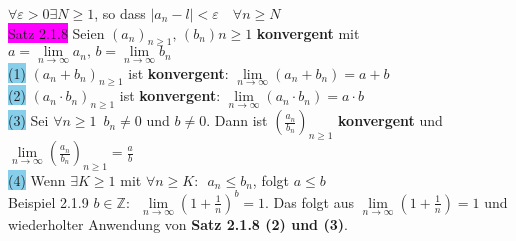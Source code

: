 \documentclass[landscape, 10pt]{article}
\newcommand{\Z}{\mathbb{Z}}
\begin{document}
\begin{multicols}{3}
{                            $\forall\varepsilon >0\exists N\geqslant 1$}, 
                            so dass \textcolor{
                            NavyBlue}{
                            $|a_n-l|<\varepsilon \quad\forall n\geqslant N$}\\
              \colorbox{magenta}{Satz 2.1.8} 
                     Seien \textcolor{NavyBlue}{
                     $(a_n)_{n\geqslant 1},\,(b_n){n\geqslant 1}$} 
                     \textbf{konvergent} mit 
                     \textcolor{NavyBlue}{$a=\lim\limits_{n\to\infty}a_n,\,
                     b=\lim\limits_{n\to\infty}b_n$}\\
                     \colorbox{SkyBlue}{(1)} 
                            \textcolor{NavyBlue}{$(a_n+b_n)_{n\geqslant 1}$} 
                            ist \textbf{konvergent}: 
                            \textcolor{NavyBlue}{
                            $\lim\limits_{n\to\infty}(a_n+b_n)=a+b$}\\
                     \colorbox{SkyBlue}{(2)} 
                            \textcolor{NavyBlue}{$(a_n\cdot b_n)_{n\geqslant 1}$} 
                            ist \textbf{konvergent}: 
                            \textcolor{NavyBlue}{
                            $\lim\limits_{n\to\infty}(a_n\cdot b_n)=a\cdot b$}\\
                     \colorbox{SkyBlue}{(3)} Sei 
                            \textcolor{NavyBlue}{$\forall n\geqslant 1\enspace b_n\neq 0$} 
                            und \textcolor{NavyBlue}{$b\neq 0$}. 
                            Dann ist 
                            \textcolor{NavyBlue}{$(\frac{a_n}{b_n})_{n\geqslant 1}$} 
                            \textbf{konvergent} und 
                            \textcolor{NavyBlue}{
                            $\lim\limits_{n\to\infty}(\frac{a_n}{b_n})_{n\geqslant 1}
                            =\frac{a}{b}$}\\
                     \colorbox{SkyBlue}{(4)} Wenn 
                            \textcolor{NavyBlue}{$\exists K\geqslant 1$} 
                            mit \textcolor{NavyBlue}{
                            $\forall n\geqslant K: \enspace a_n\leqslant b_n$}, 
                            folgt \textcolor{NavyBlue}{$a\leqslant b$}\\
              \colorbox{Dandelion}{Beispiel 2.1.9} 
                     \textcolor{NavyBlue}{$b\in\Z:\enspace
                     \lim\limits_{n\to\infty}(1+\frac{1}{n})^b=1$}.
                     Das folgt aus
                     \textcolor{NavyBlue}{
                     $\lim\limits_{n\to\infty}(1+\frac{1}{n})=1$}
                     und wiederholter Anwendung von
                     \textbf{Satz 2.1.8 (2) und (3)}.

\end{multicols}
\end{document}
